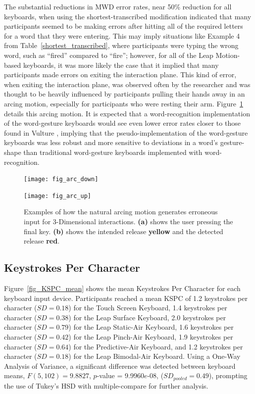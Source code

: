 The substantial reductions in MWD error rates, near 50\% reduction for all keyboards, when using the shortest-transcribed modification indicated that many participants seemed to be making errors after hitting all of the required letters for a word that they were entering. This may imply situations like Example 4 from Table~\ref{shortest_transcribed}, where participants were typing the wrong word, such as ``fired'' compared to ``fire''; however, for all of the Leap Motion-based keyboards, it was more likely the case that it implied that many participants made errors on exiting the interaction plane. This kind of error, when exiting the interaction plane, was observed often by the researcher and was thought to be heavily influenced by participants pulling their hands away in an arcing motion, especially for participants who were resting their arm. Figure~\ref{arcing_motion} details this arcing motion. It is expected that a word-recognition implementation of the word-gesture keyboards would see even lower error rates closer to those found in Vulture \cite{ref_vulture}, implying that the pseudo-implementation of the word-gesture keyboards was less robust and more sensitive to deviations in a word's gesture-shape than traditional word-gesture keyboards implemented with word-recognition.

\begin{figure}[h]
	\centering
	\begin{minipage}[t]{2.5in}
		\texttt{[image: fig\_arc\_down]}
	\end{minipage}
	\begin{minipage}[t]{2.5in}
		\texttt{[image: fig\_arc\_up]}
	\end{minipage}
	\caption[Arcing Motion]{Examples of how the natural arcing motion generates erroneous input for 3-Dimensional interactions. \textbf{(a)} shows the user pressing the final key. \textbf{(b)} shows the intended release \textbf{yellow} and the detected release \textbf{red}.}
	\label{arcing_motion}
\end{figure}

\subsection{Keystrokes Per Character}
Figure~\ref{fig_KSPC_mean} shows the mean Keystrokes Per Character for each keyboard input device. Participants reached a mean KSPC of 1.2 keystrokes per character ($SD = 0.18$) for the Touch Screen Keyboard, 1.4 keystrokes per character  ($SD = 0.38$) for the Leap Surface Keyboard, 2.0 keystrokes per character ($SD = 0.79$) for the Leap Static-Air Keyboard, 1.6 keystrokes per character ($SD = 0.42$) for the Leap Pinch-Air Keyboard, 1.9 keystrokes per character ($SD = 0.64$) for the Predictive-Air Keyboard, and 1.2 keystrokes per character ($SD = 0.18$) for the Leap Bimodal-Air Keyboard. Using a One-Way Analysis of Variance, a significant difference was detected between keyboard means, $F(5, 102) = 9.8827$, $p$-value = 9.9960$e$-08, ($SD_{pooled} = 0.49$), prompting the use of Tukey's HSD with multiple-compare for further analysis.

